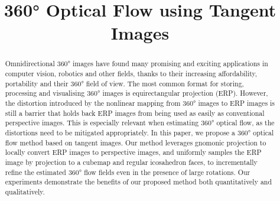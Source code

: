 \documentclass{bmvc2k}
\title{360\!° Optical Flow using Tangent Images}
\begin{document}
\maketitle

\begin{abstract}
\noindent
Omnidirectional 360° images have found many promising and exciting applications in computer vision, robotics and other fields, thanks to their increasing affordability, portability and their 360° field of view.
%
The most common format for storing, processing and visualising 360° images is equirectangular projection (ERP).
%
However, the distortion introduced by the nonlinear mapping from 360° images to ERP images is still a barrier that holds back ERP images from being used as easily as conventional perspective images.
This is especially relevant when estimating 360° optical flow, as the distortions need to be mitigated appropriately.
In this paper, we propose a 360° optical flow method based on tangent images.
Our method leverages gnomonic projection to locally convert ERP images to perspective images, and uniformly samples the ERP image by projection to a cubemap and regular icosahedron faces, to incrementally refine the estimated 360° flow fields even in the presence of large rotations.
%
Our experiments demonstrate the benefits of our proposed method both quantitatively and qualitatively.
%
\end{abstract}












%
\end{document}
